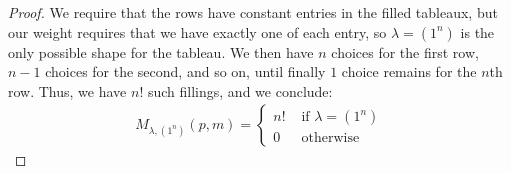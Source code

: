\documentclass[12pt]{extarticle}
\newcommand{\<}{\langle}
\renewcommand{\>}{\rangle}
\theoremstyle{definition}
\begin{document}
\begin{proof}
  We require that the rows have constant entries in the filled tableaux, but our weight requires that we have exactly one of each entry, so $\lambda = (1^n)$ is the only possible shape for the tableau.
  We then have $n$ choices for the first row, $n-1$ choices for the second, and so on, until finally $1$ choice remains for the $n$th row. Thus, we have $n!$ such fillings, and we conclude:
  \begin{align*}
    M_{\lambda, (1^n)}(p,m) =
    \begin{cases}
      n! & \text{ if } \lambda = (1^n) \\
      0 & \text{ otherwise}
    \end{cases}
  \end{align*}
\end{proof}
\end{document}
